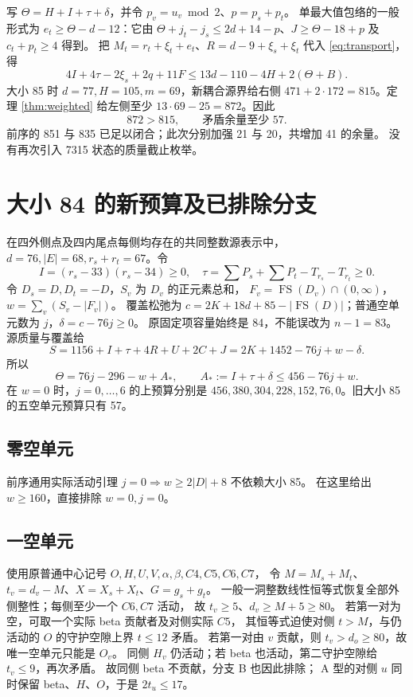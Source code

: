 \documentclass[11pt,a4paper]{article}
\newcommand{\FS}{\operatorname{FS}}
\newcommand{\A}{A_*}
\begin{document}
写 $\Theta=H+I+\tau+\delta$，并令 $p_v=u_v\bmod2$、$p=p_s+p_t$。
单最大值包络的一般形式为
$e_t\ge\Theta-d-12$：它由
$\Theta+j_t-j_s\le2d+14-p$、$J\ge\Theta-18+p$ 及 $c_t+p_t\ge4$ 得到。
把 $M_t=r_t+\xi_t+e_t$、$R=d-9+\xi_s+\xi_t$ 代入 \eqref{eq:transport}，得
\begin{equation}\label{eq:master}
4I+4\tau-2\xi_s+2q+11F\le13d-110-4H+2(\Theta+B).
\end{equation}
大小 85 时 $d=77,H=105,m=69$，新耦合源界给右侧
$471+2\cdot172=815$。定理 \ref{thm:weighted} 给左侧至少
$13\cdot69-25=872$。因此
\[\boxed{872>815,\qquad\text{矛盾余量至少 }57.}\]
前序的 851 与 835 已足以闭合；此次分别加强 21 与 20，共增加 41 的余量。
没有再次引入 7315 状态的质量截止枚举。

\section{大小 84 的新预算及已排除分支}\label{sec:84}
在四外侧点及四内尾点每侧均存在的共同整数源表示中，
$d=76,|E|=68,r_s+r_t=67$。令
\[
I=(r_s-33)(r_s-34)\ge0,\quad
\tau=\sum P_s+\sum P_t-T_{r_s}-T_{r_t}\ge0.
\]
令 $D_s=D,D_t=-D$，$S_v$ 为 $D_v$ 的正元素总和，
$F_v=\FS(D_v)\cap(0,\infty)$，$w=\sum_v(S_v-|F_v|)$。
覆盖松弛为 $c=2K+18d+85-|\FS(D)|$；普通空单元数为 $j$，$\delta=c-76j\ge0$。
原固定项容量始终是 84，不能误改为 $n-1=83$。
源质量与覆盖给
\[
S=1156+I+\tau+4R+U+2C+J=2K+1452-76j+w-\delta.
\]
所以
\begin{equation}\label{eq:84budget}
\Theta=76j-296-w+\A,\qquad
\boxed{\A:=I+\tau+\delta\le456-76j+w.}
\end{equation}
在 $w=0$ 时，$j=0,\ldots,6$ 的上预算分别是
$456,380,304,228,152,76,0$。旧大小 85 的五空单元预算只有 57。

\subsection*{零空单元}
前序通用实际活动引理 $j=0\Rightarrow w\ge2|D|+8$ 不依赖大小 85。
在这里给出 $w\ge160$，直接排除 $w=0,j=0$。

\subsection*{一空单元}
使用原普通中心记号 $O,H,U,V,\alpha,\beta,C4,C5,C6,C7$，
令 $M=M_s+M_t$、$t_v=d_v-M$、$X=X_s+X_t$、$G=g_s+g_t$。
一般一洞整数线性恒等式恢复全部外侧整性；每侧至少一个 $C6,C7$ 活动，
故 $t_v\ge5$、$d_v\ge M+5\ge80$。
若第一对为空，可取一个实际 beta 贡献者及对侧实际 $C5$，
其恒等式迫使对侧 $t>M$，与仍活动的 $O$ 的守护空隙上界 $t\le12$ 矛盾。
若第一对由 $v$ 贡献，则 $t_v>d_o\ge80$，故唯一空单元只能是 $O_v$。
同侧 $H_v$ 仍活动；若 beta 也活动，第二守护空隙给 $t_v\le9$，再次矛盾。
故同侧 beta 不贡献，分支 B 也因此排除；
A 型的对侧 $u$ 同时保留 beta、$H$、$O$，于是 $2t_u\le17$。
\end{document}
